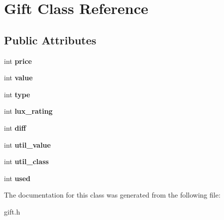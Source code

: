 \section{Gift Class Reference}
\label{class_gift}
\subsection*{Public Attributes}
\begin{DoxyCompactItemize}
\item 
\mbox{\label{class_gift_ad795362f286e8d5d73514fb64ac478b8}} 
int {\bfseries price}
\item 
\mbox{\label{class_gift_a71d14b92ebfd06993afe584f088bc748}} 
int {\bfseries value}
\item 
\mbox{\label{class_gift_a63fb63fdc6f0821417039da90a54ad4c}} 
int {\bfseries type}
\item 
\mbox{\label{class_gift_a1834eff426487e91e5472657dd2095c7}} 
int {\bfseries lux\+\_\+rating}
\item 
\mbox{\label{class_gift_a2aac15eb2d8a37b577f463d79993b732}} 
int {\bfseries diff}
\item 
\mbox{\label{class_gift_af2b1ccae48749eb6f87a995bbf914639}} 
int {\bfseries util\+\_\+value}
\item 
\mbox{\label{class_gift_a321d3b9bae12ee12ba7b21cdbae8ab38}} 
int {\bfseries util\+\_\+class}
\item 
\mbox{\label{class_gift_a060bb74b499ea64b7448f6395c5151be}} 
int {\bfseries used}
\end{DoxyCompactItemize}


The documentation for this class was generated from the following file\+:\begin{DoxyCompactItemize}
\item 
gift.\+h\end{DoxyCompactItemize}
